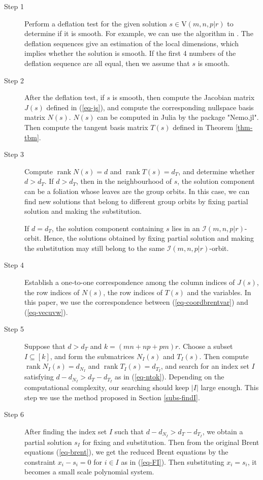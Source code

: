 \documentclass[reqno]{amsart}
\theoremstyle{definition}
\numberwithin{equation}{section}
\theoremstyle{remark}
\begin{document}
\begin{description}
\item[Step 1] Perform a deflation test for the given solution $s\in \mathrm{V}(m,n,p|r)$ to determine if it is smooth. 
    For example, we can use the algorithm in \cite{li25def}. The deflation sequences give an estimation of the local dimensions, which implies whether the solution is smooth. If the first 4 numbers of the deflation sequence are all equal, then we assume that $s$ is smooth. 
    

\item[Step 2] After the deflation test, if $s$ is smooth, then 
compute the Jacobian matrix $J(s)$ defined in (\ref{eq-js}), and compute the corresponding nullspace basis matrix $N(s)$. $N(s)$ can be computed in Julia by the package "Nemo.jl". Then compute the tangent basis matrix $T(s)$ defined in Theorem \ref{thm-tbm}.

\item[Step 3] Compute $\operatorname{rank}N(s)=d$ and $\operatorname{rank}T(s)=d_T$, and determine whether
$d>d_T$. If $d>d_T$, then in the neighbourhood of $s$, the solution component can be a foliation whose leaves are the group orbits.
In this case, we can find new solutions that belong to different group orbits by fixing partial solution and making the substitution.

If $d=d_T$, the solution component containing $s$ lies in an 
$\mathcal{I}(m,n,p|r)$-orbit. Hence, the solutions obtained by fixing partial solution and making the substitution may still belong to the same $\mathcal{I}(m,n,p|r)$-orbit.

\item[Step 4]
Establish a one-to-one correspondence among the column indices of $J(s)$, the row indices of $N(s)$, the row indices of $T(s)$ and the variables. In this paper, we use the correspondence between (\ref{eq-coordbrentvar}) and (\ref{eq-vecuvw}).

\item[Step 5] 
Suppose that $d>d_T$ and $k=(mn+np+pm)r$. 
Choose a subset $I\subseteq[k]$, and form the submatrices
$N_I(s)$ and $T_I(s)$. Then compute $\operatorname{rank}N_I(s)=d_{N_I}$ and $\operatorname{rank}T_I(s)=d_{T_I}$, and search for
an index set $I$ satisfying $d-d_{N_I}>d_T-d_{T_I}$ as in (\ref{eq-ntok}). Depending on the computational complexity, our searching should keep $|I|$ large enough. This step we use the method proposed in Section \ref{subs-findI}.

\item[Step 6]
After finding the index set $I$ such that $d-d_{N_I}>d_T-d_{T_I}$, we obtain a partial solution $s_I$ for fixing and substitution. Then from the original Brent equations (\ref{eq-brent}), we get the reduced Brent equations by the constraint $x_i-s_i=0$ for $i\in I$ as in (\ref{eq-FI}). Then substituting $x_i=s_i$, it becomes a small scale polynomial system.


\end{description}
\end{document}

